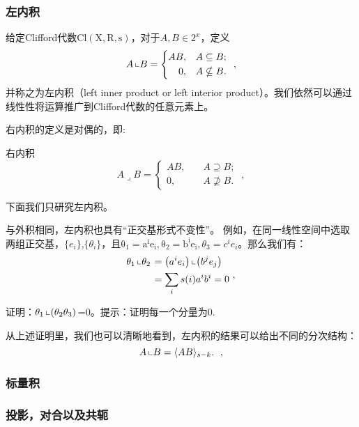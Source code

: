 \subsubsection{左内积}
\begin{definition}{}
给定Clifford代数$\mathrm {Cl(X,R,s)}$，对于$A,B\in 2^x$，定义
\begin{equation}
A\left\llcorner B=\left\{\begin{aligned}
A B,\quad & A \subseteq B ; \\
0,\quad & A \nsubseteq B .
\end{aligned}\right.\right.~,
\end{equation}
并称之为左内积（left inner product or left interior product）。我们依然可以通过线性性将运算推广到Clifford代数的任意元素上。
\end{definition}
右内积的定义是对偶的，即:
\begin{definition}{右内积}
\begin{equation}
A\lrcorner B=\left\{\begin{aligned}
A B,\quad & A \supseteq B ; \\
0,\quad & A \nsupseteq B .
\end{aligned}\right.~,
\end{equation}
\end{definition}
下面我们只研究左内积。

与外积相同，左内积也具有“正交基形式不变性”。
例如，在同一线性空间中选取两组正交基，$\{e_i\}$,$\{\theta _i\}$，且$\mathrm {\theta_1=a^ie_i,\theta_2=b^ie_i},\theta_3=c^ie_i$。那么我们有：
\begin{equation}
\begin{aligned}
\theta_1\left\llcorner\theta_2\right. & =\left(a^i e_i\right)\left\llcorner\left(b^j e_j\right)\right. \\
& =\sum_i s(i) a^i b^i=0
\end{aligned}~,
\end{equation}
\begin{exercise}{}
证明：$\theta_1\left\llcorner(\theta_2\theta_3)\right.$=0。提示：证明每一个分量为0.
\end{exercise}
从上述证明里，我们也可以清晰地看到，左内积的结果可以给出不同的分次结构：
\begin{equation}
A\left\llcorner B=\langle A B\rangle_{s-k} .\right.~,
\end{equation}

\subsubsection{标量积}

\subsubsection{投影，对合以及共轭}
